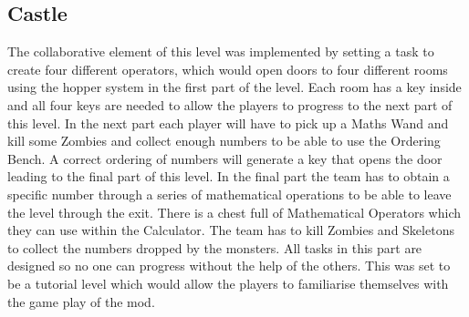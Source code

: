 \subsection{Castle}
The collaborative element of this level was implemented by setting a task to create four different operators, which would open doors to four different rooms using the hopper system in the first part of the level. Each room has a key inside and all four keys are needed to allow the players to progress to the next part of this level.\newline\newline
In the next part each player will have to pick up a Maths Wand and kill some Zombies and collect enough numbers to be able to use the Ordering Bench. A correct ordering of numbers will generate a key that opens the door leading to the final part of this level.\newline\newline
In the final part the team has to obtain a specific number through a series of mathematical operations to be able to leave the level through the exit. There is a chest full of Mathematical Operators which they can use within the Calculator. The team has to kill Zombies and Skeletons to collect the numbers dropped by the monsters.\newline\newline
All tasks in this part are designed so no one can progress without the help of the others. This was set to be a tutorial level which would allow the players to familiarise themselves with the game play of the mod.
